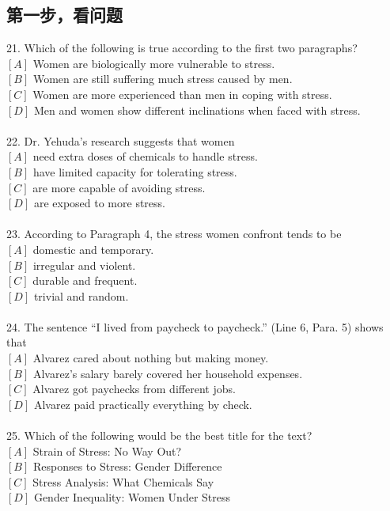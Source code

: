 \documentclass[a4paper]{ctexart}
\begin{document}
\subsection{第一步，看问题}

21.	Which of the following is true according to the first two paragraphs?\\
$[A]$ Women are biologically more vulnerable to stress.\\
$[B]$ Women are still suffering much stress caused by men.\\
$[C]$ Women are more experienced than men in coping with stress.\\
$[D]$ Men and women show different inclinations when faced with stress.\\
\\
22.	Dr. Yehuda’s research suggests that women\\
$[A]$ need extra doses of chemicals to handle stress.\\
$[B]$ have limited capacity for tolerating stress.\\
$[C]$ are more capable of avoiding stress.\\
$[D]$ are exposed to more stress.\\
\\
23.	According to Paragraph 4, the stress women confront tends to be\\
$[A]$ domestic and temporary.\\
$[B]$ irregular and violent.\\
$[C]$ durable and frequent.\\
$[D]$ trivial and random.\\
\\
24.	The sentence “I lived from paycheck to paycheck.” (Line 6, Para. 5) shows that\\
$[A]$ Alvarez cared about nothing but making money.\\
$[B]$ Alvarez’s salary barely covered her household expenses.\\
$[C]$ Alvarez got paychecks from different jobs.\\
$[D]$ Alvarez paid practically everything by check.\\
\\
25.	Which of the following would be the best title for the text?\\
$[A]$ Strain of Stress: No Way Out?\\
$[B]$ Responses to Stress: Gender Difference\\
$[C]$ Stress Analysis: What Chemicals Say\\
$[D]$ Gender Inequality: Women Under Stress\\
\end{document}
